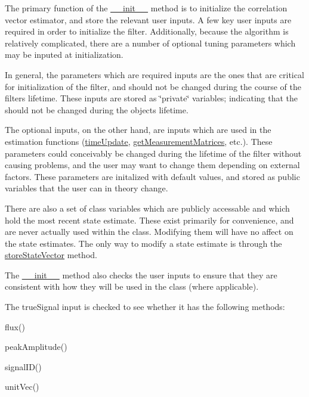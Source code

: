 The primary function of the \hyperlink{classmodest_1_1substates_1_1correlationvector_1_1CorrelationVector_ab344abe2451cdb5e476960cd3745eb62}{\+\_\+\+\_\+init\+\_\+\+\_\+} method is to initialize the correlation vector estimator, and store the relevant user inputs. A few key user inputs are required in order to initialize the filter. Additionally, because the algorithm is relatively complicated, there are a number of optional tuning parameters which may be inputed at initialization.

In general, the parameters which are required inputs are the ones that are critical for initialization of the filter, and should not be changed during the course of the filter\textquotesingle{}s lifetime. These inputs are stored as \char`\"{}private\char`\"{} variables; indicating that the should not be changed during the object\textquotesingle{}s lifetime.

The optional inputs, on the other hand, are inputs which are used in the estimation functions (\hyperlink{classmodest_1_1substates_1_1correlationvector_1_1CorrelationVector_a59c13e5fa26ba27717494f687ec78ef8}{time\+Update}, \hyperlink{classmodest_1_1substates_1_1correlationvector_1_1CorrelationVector_a2fb13d8c6fffa49ee641dd918a64db4b}{get\+Measurement\+Matrices}, etc.). These parameters could conceivably be changed during the lifetime of the filter without causing problems, and the user may want to change them depending on external factors. These parameters are initalized with default values, and stored as public variables that the user can in theory change.

There are also a set of class variables which are publicly accessable and which hold the most recent state estimate. These exist primarily for convenience, and are never actually used within the class. Modifying them will have no affect on the state estimates. The only way to modify a state estimate is through the \hyperlink{classmodest_1_1substates_1_1correlationvector_1_1CorrelationVector_a70ed47697f09424e62e52133fdfb59de}{store\+State\+Vector} method.

The \hyperlink{classmodest_1_1substates_1_1correlationvector_1_1CorrelationVector_ab344abe2451cdb5e476960cd3745eb62}{\+\_\+\+\_\+init\+\_\+\+\_\+} method also checks the user inputs to ensure that they are consistent with how they will be used in the class (where applicable).

The true\+Signal input is checked to see whether it has the following methods\+:
\begin{DoxyItemize}
\item flux()
\item peak\+Amplitude()
\item signal\+I\+D()
\item unit\+Vec()
\end{DoxyItemize}


